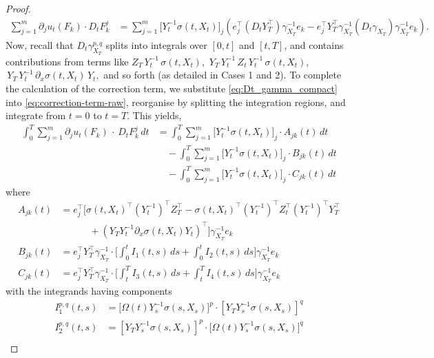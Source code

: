 \documentclass[]{interact}
\newcommand{\1}{\mathbf{1}}
\theoremstyle{plain}%
\theoremstyle{definition}
\theoremstyle{remark}
\numberwithin{equation}{section}
\begin{document}
\begin{proof}
\begin{align}
\label{eq:correction-term-raw}
\sum_{j=1}^m \partial_j u_t(F_k) \cdot D_t F_k^j 
&= \sum_{j=1}^m \bigl[ Y_t^{-1} \sigma(t, X_t) \bigr]_j 
   \left( e_j^\top (D_t Y_T^\top) \gamma_{X_T}^{-1} e_k - e_j^\top Y_T^\top \gamma_{X_T}^{-1} (D_t \gamma_{X_T}) \gamma_{X_T}^{-1} e_k \right).
\end{align}
%
Now, recall that \(\displaystyle D_t \gamma_{X_T}^{p,q}\) splits into integrals over \([0,t]\) and \([t,T]\), 
and contains contributions from terms like 
\(Z_T\,Y_t^{-1}\,\sigma(t,X_t)\), 
\(\,Y_T\,Y_t^{-1}\,Z_t\,Y_t^{-1}\,\sigma(t,X_t)\), 
\(\,Y_T\,Y_t^{-1}\,\partial_x \sigma(t,X_t)\,Y_t,\) 
and so forth  (as detailed in Cases 1 and 2). 
To complete the calculation of the correction term, we substitute \eqref{eq:Dt_gamma_compact} into \eqref{eq:correction-term-raw}, reorganise by splitting the integration regions, and integrate from $t=0$ to $t=T$. This yields,
%
\begin{align*}
\int_0^T \sum_{j=1}^m \partial_j u_t(F_k) \,\cdot\, D_t F_k^j \, dt &= \int_0^T \sum_{j=1}^m \bigl[ Y_t^{-1} \sigma(t, X_t) \bigr]_j \cdot A_{jk}(t) \, dt \\
&\quad - \int_0^T \sum_{j=1}^m \bigl[ Y_t^{-1} \sigma(t, X_t) \bigr]_j \cdot B_{jk}(t) \, dt \\
&\quad - \int_0^T \sum_{j=1}^m \bigl[ Y_t^{-1} \sigma(t, X_t) \bigr]_j \cdot C_{jk}(t) \, dt
\end{align*}
where 
\begin{align*}
A_{jk}(t) &= e_j^\top \bigg[ \sigma(t, X_t)^\top (Y_t^{-1})^\top Z_T^\top - \sigma(t, X_t)^\top (Y_t^{-1})^\top Z_t^\top (Y_t^{-1})^\top Y_T^\top \\
&\quad\quad\quad + \left( Y_T Y_t^{-1} \partial_x \sigma(t, X_t) Y_t \right)^\top \bigg] \gamma_{X_T}^{-1} e_k \\[0.5em]
B_{jk}(t) &= e_j^\top Y_T^\top \gamma_{X_T}^{-1} \cdot \bigg[ \int_0^t I_1(t,s) \, ds + \int_0^t I_2(t,s) \, ds \bigg] \gamma_{X_T}^{-1} e_k \\[0.5em]
C_{jk}(t) &= e_j^\top Y_T^\top \gamma_{X_T}^{-1} \cdot \bigg[ \int_t^T I_3(t,s) \, ds + \int_t^T I_4(t,s) \, ds \bigg] \gamma_{X_T}^{-1} e_k
\end{align*}
with the integrands having components
\begin{align*}
I^{p,q}_1(t,s) &= \bigg[ \Omega(t) Y_s^{-1}\sigma(s, X_s) \bigg]^p \cdot [Y_T Y_s^{-1} \sigma(s, X_s)]^q \\[0.5em]
I^{p,q}_2(t,s) &= [Y_T Y_s^{-1} \sigma(s, X_s)]^p \cdot \bigg[ \Omega(t) Y_s^{-1}\sigma(s, X_s) \bigg]^q \\[0.5em]

\end{align*}
\end{proof}
\end{document}
